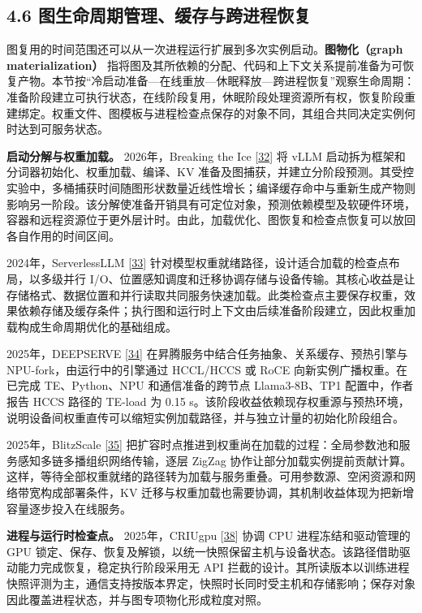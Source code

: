 \documentclass[UTF8,10.5pt,fontset=windows]{ctexart}
\begin{document}
\hypertarget{section-4-6}{%
\subsection{4.6 图生命周期管理、缓存与跨进程恢复}\label{section-4-6}}

图复用的时间范围还可以从一次进程运行扩展到多次实例启动。\textbf{图物化（graph
materialization）}
指将图及其所依赖的分配、代码和上下文关系提前准备为可恢复产物。本节按``冷启动准备---在线重放---休眠释放---跨进程恢复''观察生命周期：准备阶段建立可执行状态，在线阶段复用，休眠阶段处理资源所有权，恢复阶段重建绑定。权重文件、图模板与进程检查点保存的对象不同，其组合共同决定实例何时达到可服务状态。

\textbf{启动分解与权重加载。} 2026年，Breaking the Ice
{[}\protect\hyperlink{ref-kabakibo2026breakingice}{32}{]} 将 vLLM
启动拆为框架和分词器初始化、权重加载、编译、KV
准备及图捕获，并建立分阶段预测。其受控实验中，多桶捕获时间随图形状数量近线性增长；编译缓存命中与重新生成产物则影响另一阶段。该分解使准备开销具有可定位对象，预测依赖模型及软硬件环境，容器和远程资源位于更外层计时。由此，加载优化、图恢复和检查点恢复可以放回各自作用的时间区间。

2024年，ServerlessLLM
{[}\protect\hyperlink{ref-fu2024serverlessllm}{33}{]}
针对模型权重就绪路径，设计适合加载的检查点布局，以多级并行
I/O、位置感知调度和迁移协调存储与设备传输。其核心收益是让存储格式、数据位置和并行读取共同服务快速加载。此类检查点主要保存权重，效果依赖存储及缓存条件；执行图和运行时上下文由后续准备阶段建立，因此权重加载构成生命周期优化的基础组成。

2025年，DEEPSERVE {[}\protect\hyperlink{ref-hu2025deepserve}{34}{]}
在昇腾服务中结合任务抽象、关系缓存、预热引擎与
NPU-fork，由运行中的引擎通过 HCCL/HCCS 或 RoCE
向新实例广播权重。在已完成 TE、Python、NPU 和通信准备的跨节点
Llama3-8B、TP1 配置中，作者报告 HCCS 路径的 TE-load 为 0.15
s。该阶段收益依赖现存权重源与预热环境，说明设备间权重直传可以缩短实例加载路径，并与独立计量的初始化阶段组合。

2025年，BlitzScale {[}\protect\hyperlink{ref-zhang2025blitzscale}{35}{]}
把扩容时点推进到权重尚在加载的过程：全局参数池和服务感知多链多播组织网络传输，逐层
ZigZag
协作让部分加载实例提前贡献计算。这样，等待全部权重就绪的路径转为加载与服务重叠。可用参数源、空闲资源和网络带宽构成部署条件，KV
迁移与权重加载也需要协调，其机制收益体现为把新增容量逐步投入在线服务。

\textbf{进程与运行时检查点。} 2025年，CRIUgpu
{[}\protect\hyperlink{ref-stoyanov2025criugpu}{38}{]} 协调 CPU
进程冻结和驱动管理的 GPU
锁定、保存、恢复及解锁，以统一快照保留主机与设备状态。该路径借助驱动能力完成恢复，稳定执行阶段采用无
API
拦截的设计。其所读版本以训练进程快照评测为主，通信支持按版本界定，快照时长同时受主机和存储影响；保存对象因此覆盖进程状态，并与图专项物化形成粒度对照。
\end{document}

